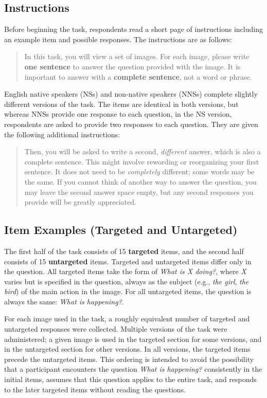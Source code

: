\documentclass[12pt]{article}
\begin{document}
\subsection{Instructions} 
Before beginning the task, respondents read a short page of instructions including an example item and possible responses. The instructions are as follows:

\begin{quotation}\noindent
In this task, you will view a set of images. For each image, please write \textbf{one sentence} to answer the question provided with the image. It is important to answer with a \textbf{complete sentence}, not a word or phrase.
\end{quotation}

English native speakers (NSs) and non-native speakers (NNSs) complete slightly different versions of the task. The items are identical in both versions, but whereas NNSs provide one response to each question, in the NS version, respondents are asked to provide two responses to each question. They are given the following additional instructions:

\begin{quotation}\noindent
Then, you will be asked to write a second, \textit{different} answer, which is also a complete sentence. This might involve rewording or reorganizing your first sentence. It does not need to be \textit{completely} different; some words may be the same. If you cannot think of another way to answer the question, you may leave the second answer space empty, but any second responses you provide will be greatly appreciated.
\end{quotation}

\subsection{Item Examples (Targeted and Untargeted)}

The first half of the task consists of 15 \textbf{targeted} items, and the second half consists of 15 \textbf{untargeted} items. Targeted and untargeted items differ only in the question. All targeted items take the form of \textit{What is X doing?}, where \textit{X} varies but is specified in the question, always as the subject (e.g., \textit{the girl}, \textit{the bird}) of the main action in the image. For all untargeted items, the question is always the same: \textit{What is happening?}.

For each image used in the task, a roughly equivalent number of targeted and untargeted responses were collected. Multiple versions of the task were administered; a given image is used in the targeted section for some versions, and in the untargeted section for other versions. In all versions, the targeted items precede the untargeted items. This ordering is intended to avoid the possibility that a participant encounters the question \textit{What is happening?} consistently in the initial items, assumes that this question applies to the entire task, and responds to the later targeted items without reading the questions.
\end{document}
